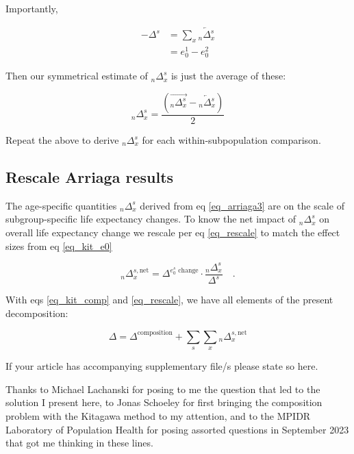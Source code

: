 \documentclass[sn-apa,pdflatex]{sn-jnl}
\theoremstyle{remark}
\theoremstyle{definition}
\begin{document}
Importantly,

\begin{align}
\label{eq_sum2}
 -\Delta^s &= \sum_x \overleftarrow{{}_n\Delta_x^s} \\
 &= e_0^1 - e_0^2 \nonumber
\end{align}

Then our symmetrical estimate of \({}_n\Delta_x^s\) is just the average
of these:

\begin{equation}
\label{eq_arriaga3}
{}_n\Delta_x^s = \frac{\left(\overrightarrow{{}_n\Delta_x^s} -  \overleftarrow{{}_n\Delta_x^s}\right)}{2}
\end{equation}

Repeat the above to derive \({}_n\Delta_x^s\) for each
within-subpopulation comparison.

\hypertarget{rescale-arriaga-results}{%
\subsection{Rescale Arriaga results}\label{rescale-arriaga-results}}

The age-specific quantities \({}_n\Delta_x^s\) derived from eq
\eqref{eq_arriaga3} are on the scale of subgroup-specific life
expectancy changes. To know the net impact of \({}_n\Delta_x^s\) on
overall life expectancy change we rescale per eq \eqref{eq_rescale} to
match the effect sizes from eq \eqref{eq_kit_e0}

\begin{equation}
\label{eq_rescale}
{}_n\Delta_x^{s,\text{net}} = \Delta^{e_0^s\text{~change}} \cdot \frac{{}_n\Delta_x^s}{\Delta^s} \quad \mathrm{.}
\end{equation}

With eqs \eqref{eq_kit_comp} and \eqref{eq_rescale}, we have all
elements of the present decomposition:

\begin{equation}
\label{eq_full}
\Delta = \Delta^\text{composition} + \sum_s \sum_x {}_n\Delta_x^{s,\text{net}}
\end{equation}

\backmatter


If your article has accompanying supplementary file/s please state so
here.


Thanks to Michael Lachanski for posing to me the question that led to
the solution I present here, to Jonas Schoeley for first bringing the
composition problem with the Kitagawa method to my attention, and to the
MPIDR Laboratory of Population Health for posing assorted questions in
September 2023 that got me thinking in these lines.
\end{document}
